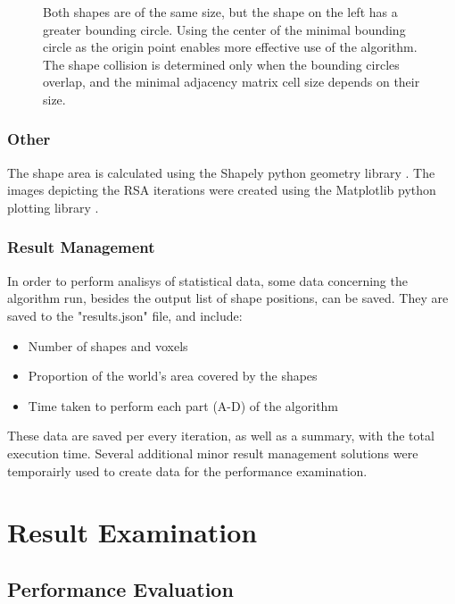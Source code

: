 \documentclass[12pt, oneside]{report}
\begin{document}
\begin{figure}
\caption{Both shapes are of the same size, but the shape on the left has a greater bounding circle. Using the center of the minimal bounding circle as the origin point enables more effective use of the algorithm. The shape collision is determined only when the bounding circles overlap, and the minimal adjacency matrix cell size depends on their size.}
\end{figure}

\subsection{Other}

The shape area is calculated using the Shapely python geometry library \cite{shapely}. \newline
The images depicting the RSA iterations were created using the Matplotlib python plotting library \cite{matplotlib}.

\subsection{Result Management}

In order to perform analisys of statistical data, some data concerning the algorithm run, besides the output list of shape positions, can be saved. They are saved to the "results.json" file, and include:
\begin{itemize}
  \item Number of shapes and voxels
 	\item Proportion of the world's area covered by the shapes
	\item Time taken to perform each part (A-D) of the algorithm
\end{itemize}
These data are saved per every iteration, as well as a summary, with the total execution time. \newline
Several additional minor result management solutions were temporairly used to create data for the performance examination.



\chapter{Result Examination}
\section{Performance Evaluation}
\end{document}
